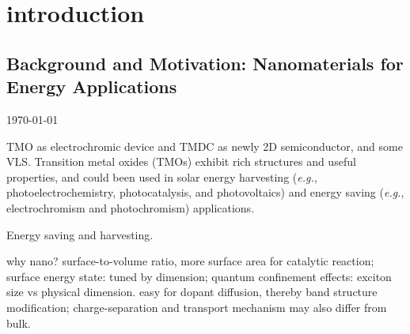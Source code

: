 
\chapter{introduction}

\section{Background and Motivation: Nanomaterials for Energy Applications}
\today

TMO as electrochromic device and TMDC as newly 2D semiconductor, and some VLS.
Transition metal oxides (TMOs) exhibit rich structures and useful properties, and could been used in solar energy harvesting (\emph{e.g.}, photoelectrochemistry, photocatalysis, and photovoltaics) and energy saving (\emph{e.g.}, electrochromism and photochromism) applications. 

\iffalse
Materials that human can make define the age they live in. From Stone Age to Bronze Age and Iron Age, people evolve as mastering more and more sophisticated techniques of manipulating metals, such as alloying and annealing. Obtaining extreme high purity of silicon brings us into Information Age. Future is difficult to predict. But nanotechnology is one direction that we can not ignore. According to \gls{nni}, \gls{nanotechnology}. This definition alludes that dimension comes before compositions. It is often related to the quantum confinement or surface area in nanomaterials, which we will later revisit with specific scenario.

There are three states of matter under usual conditions: solid,liquid and gas. Solids materials could be further categorized into five groups: metals, ceramics, polymers, semiconductors, and composites.\cite{William2009} This classification is based on both composition and mechanical, electrical, and thermal properties as well as the associated functionality(i.e., \gls{ceramics} are typically hard yet brittle, insulating to electricity and resistant to heating).

\fi
Energy saving and harvesting. 

why nano? surface-to-volume ratio, more surface area for catalytic reaction; surface energy state: tuned by dimension; quantum confinement effects: exciton size vs physical dimension. easy for dopant diffusion, thereby band structure modification; charge-separation and transport mechanism may also differ from bulk.

